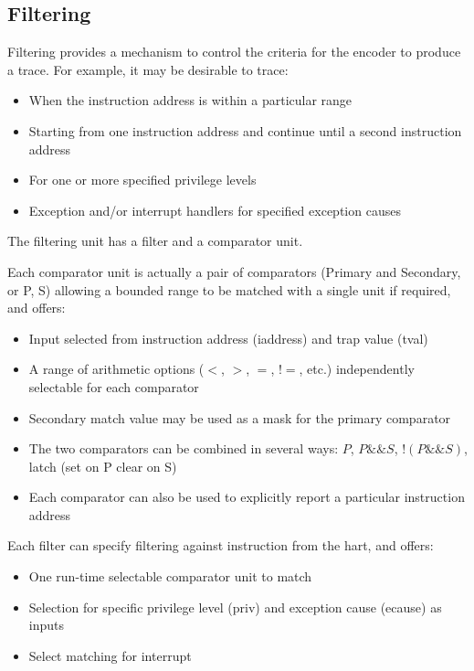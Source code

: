 \documentclass[main\_\_EN.tex]{subfiles}
\begin{document}
\subsection{Filtering}\label{sec:riscvtracenc-filter}

Filtering provides a mechanism to control the criteria for the encoder to produce a trace. For example, it may be desirable to trace:
\begin{itemize}
    \item When the instruction address is within a particular range
    \item Starting from one instruction address and continue until a second instruction address
    \item For one or more specified privilege levels
    \item Exception and/or interrupt handlers for specified exception causes
\end{itemize}

The filtering unit has a filter and a comparator unit.

Each comparator unit is actually a pair of comparators (Primary and Secondary, or P, S) allowing a bounded range to be matched with a single unit if required, and offers:

\begin{itemize}
    \item Input selected from instruction address (iaddress) and trap value (tval)
    \item A range of arithmetic options ($<$, $>$, $=$, $!=$, etc.) independently selectable for each comparator
    \item Secondary match value may be used as a mask for the primary comparator
    \item The two comparators can be combined in several ways: $P$, $P\&\&S$, $!(P\&\&S)$, latch (set on P clear on S)
    \item Each comparator can also be used to explicitly report a particular instruction address
\end{itemize}

Each filter can specify filtering against instruction from the hart, and offers:
\begin{itemize}
    \item One run-time selectable comparator unit to match
    \item Selection for specific privilege level (priv) and exception cause (ecause) as inputs
    \item Select matching for interrupt
\end{itemize}
\end{document}
